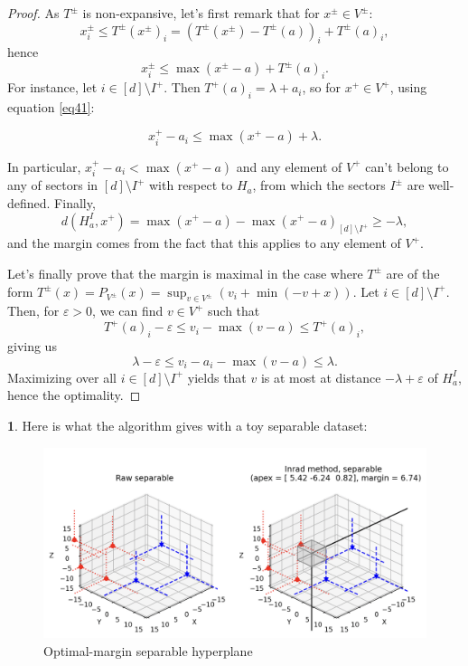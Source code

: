 \documentclass[oneside,english]{amsart}
\numberwithin{equation}{section}
\numberwithin{figure}{section}
\theoremstyle{plain}
\theoremstyle{definition}
\theoremstyle{plain}
\theoremstyle{remark}
\theoremstyle{plain}
\theoremstyle{definition}
\newtheorem{example}[thm]{\protect\examplename}
\theoremstyle{definition}
\providecommand{\examplename}{Example}
\begin{document}
\begin{proof}
As $T^\pm$ is non-expansive, let's first remark that for  $x^\pm\in V^\pm$:
$$x^\pm_i  \le T^{\pm}(x^\pm)_{i} =\left(T^{\pm}(x^\pm)-T^{\pm}(a)\right)_{i}+T^{\pm}(a)_{i},$$
hence
\begin{equation}\label{eq41}
x^\pm_i \le\max(x^\pm-a)+T^{\pm}(a)_{i}.
\end{equation}
For instance, let $i\in [d] \setminus I^{+}$.
Then $T^{+}(a)_{i}=\lambda+a_{i}$,
so for $x^{+}\in V^{+}$, using equation \ref{eq41}:


\[
x_{i}^{+}-a_{i}\le\max(x^+-a)+\lambda.
\]

In particular, $x^+_i-a_i < \max(x^+-a)$ and any element of $V^+$ can't belong to any of sectors in $[d] \setminus I^{+}$ with respect to $H_a$, from which the sectors $I^\pm$ are well-defined. Finally,
\[
d(H_{a}^{I},x^+)=\max(x^+-a)-\max(x^+-a)_{[d] \setminus I^{+}}\ge-\lambda,
\]
and the margin comes from the fact that this applies to any element of $V^+$. 

Let's finally prove that the margin is maximal in the case where $T^{\pm}$ are of the form $T^{\pm}(x) = P_{V^{\pm}}(x) = \sup_{v\in V^{\pm}} \left( v_i + \min (-v + x)\right).$ Let $i\in [d] \setminus I^{+}$. Then, for $\varepsilon > 0$, we can find $v \in V^+$ such that $$ T^+(a)_i - \varepsilon \le v_i - \max(v - a) \le T^+(a)_i,$$ giving us $$\lambda - \varepsilon \le v_i - a_i - \max(v - a) \le \lambda.$$ Maximizing over all $i\in [d] \setminus I^{+}$ yields that $v$ is at most at distance $-\lambda + \varepsilon$ of $H_a^I$, hence the optimality.


\end{proof}
\begin{example}
Here is what the algorithm gives with a toy separable dataset:

\begin{figure}[!h]
\includegraphics[scale=0.45]{fig/separable.png}
\caption{Optimal-margin separable hyperplane}
\end{figure}
\end{example}
\end{document}
